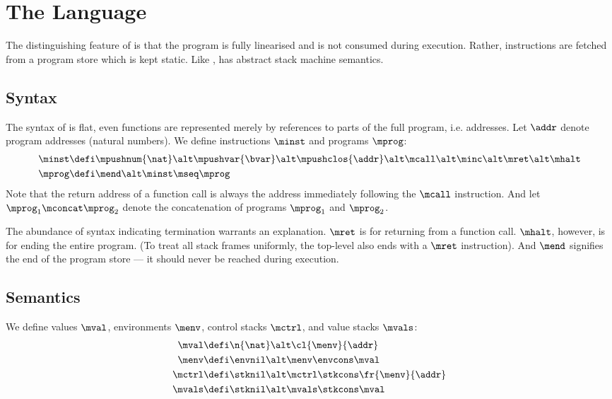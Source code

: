 \section{The \textnormal{\mlang} Language}

The distinguishing feature of \mlang is that the program is fully linearised and is not consumed during execution.
Rather, instructions are fetched from a program store which is kept static.
Like \slang, \mlang has abstract stack machine semantics.

\subsection{Syntax}

The syntax of \mlang is flat, even functions are represented merely by references to parts of the full program, i.e. addresses.
Let $\addr$ denote program addresses (natural numbers).
We define \mlang instructions $\minst$ and programs $\mprog$:
\begin{align*}
  \minst &\defi \mpushnum{\nat} \alt \mpushvar{\bvar} \alt \mpushclos{\addr} \alt \mcall \alt \minc \alt \mret \alt \mhalt \\
  \mprog &\defi \mend \alt \minst \mseq \mprog
\end{align*}
Note that the return address of a function call is always the address immediately following the $\mcall$ instruction.
And let $\mprog_1 \mconcat \mprog_2$ denote the concatenation of programs $\mprog_1$ and $\mprog_2$.

The abundance of syntax indicating termination warrants an explanation.
$\mret$ is for returning from a function call.
$\mhalt$, however, is for ending the entire program.
(To treat all stack frames uniformly, the top-level also ends with a $\mret$ instruction).
And $\mend$ signifies the end of the program store --- it should never be reached during execution.


\subsection{Semantics}

We define values $\mval$, environments $\menv$, control stacks $\mctrl$, and value stacks $\mvals$:
\begin{align*}
  \mval &\defi \n{\nat} \alt \cl{\menv}{\addr} \\
  \menv &\defi \envnil \alt \menv \envcons \mval \\
  \mctrl &\defi \stknil \alt \mctrl \stkcons \fr{\menv}{\addr} \\
  \mvals &\defi \stknil \alt \mvals \stkcons \mval
\end{align*}

